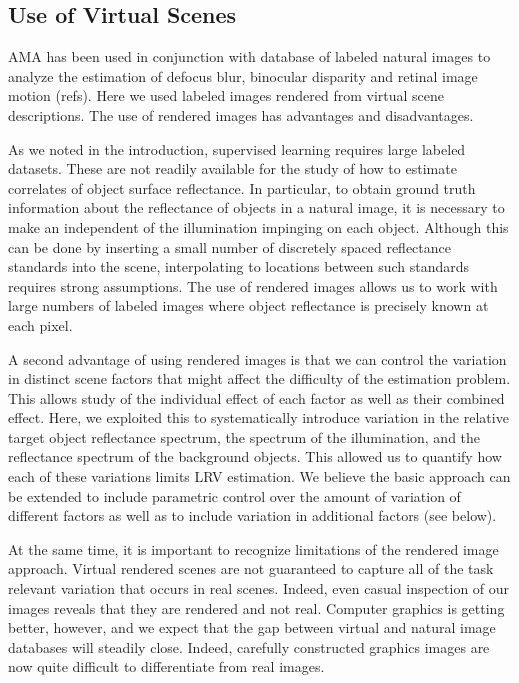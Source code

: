 \documentclass{jov}
\begin{document}
\subsection{Use of Virtual Scenes}

AMA has been used in conjunction with database of labeled natural images to analyze the estimation of defocus blur,
binocular disparity and retinal image motion (refs).
Here we used labeled images rendered from virtual scene descriptions.
The use of rendered images has advantages and disadvantages.

As we noted in the introduction, supervised learning requires large labeled datasets.
These are not readily available  for the study of how to estimate correlates of object surface reflectance.
In particular, to obtain ground truth information about the reflectance of objects in a natural image, it is necessary to
make an independent of the illumination impinging on each object.
Although this can be done by inserting a small number of discretely spaced reflectance standards into the scene, 
interpolating to locations between such standards requires strong assumptions.
The use of rendered images allows us to work with large numbers of labeled images where object reflectance
is precisely known at each pixel.

A second advantage of using rendered images is that we can control the variation in distinct
scene factors that might affect the difficulty of the estimation problem.
This allows study of the individual effect of each factor as well as their combined effect.
Here, we exploited this to systematically introduce variation in the relative target object reflectance
spectrum, the spectrum of the illumination, and the reflectance spectrum of the background objects.
This allowed us to quantify how each of these variations limits LRV estimation.
We believe the basic approach can be extended to include parametric control over the amount
of variation of different factors as well as to include variation in additional factors (see below).

At the same time, it is important to recognize limitations of the rendered image approach.
Virtual rendered scenes are not guaranteed to capture all of the task relevant
variation that occurs in real scenes.
Indeed, even casual inspection of our images reveals that they are rendered and not real.
Computer graphics is getting better, however, and we expect that the gap between
virtual and natural image databases will steadily close.
Indeed, carefully constructed graphics images are now quite difficult to differentiate
from real images.
\end{document}

